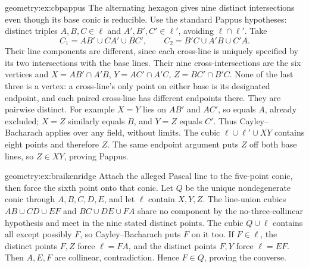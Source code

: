 \begin{solution}{geometry:ex:cbpappus}
\idea The alternating hexagon gives nine distinct intersections even though its base conic is reducible.
\writeup Use the standard Pappus hypotheses: distinct triples $A,B,C\in\ell$ and $A',B',C'\in\ell'$, avoiding $\ell\cap\ell'$. Take
\[
C_1=AB'\cup CA'\cup BC',\qquad
C_2=B'C\cup A'B\cup C'A.
\]
Their line components are different, since each cross-line is uniquely specified by its two intersections with the base lines. Their nine cross-intersections are the six vertices and $X=AB'\cap A'B$, $Y=AC'\cap A'C$, $Z=BC'\cap B'C$. None of the last three is a vertex: a cross-line's only point on either base is its designated endpoint, and each paired cross-line has different endpoints there. They are pairwise distinct. For example $X=Y$ lies on $AB'$ and $AC'$, so equals $A$, already excluded; $X=Z$ similarly equals $B$, and $Y=Z$ equals $C'$. Thus Cayley--Bacharach applies over any field, without limits. The cubic $\ell\cup\ell'\cup XY$ contains eight points and therefore $Z$. The same endpoint argument puts $Z$ off both base lines, so $Z\in XY$, proving Pappus.
\end{solution}
\begin{solution}{geometry:ex:braikenridge}
\idea Attach the alleged Pascal line to the five-point conic, then force the sixth point onto that conic.
\writeup Let $Q$ be the unique nondegenerate conic through $A,B,C,D,E$, and let $\ell$ contain $X,Y,Z$. The line-union cubics $AB\cup CD\cup EF$ and $BC\cup DE\cup FA$ share no component by the no-three-collinear hypothesis and meet in the nine stated distinct points. The cubic $Q\cup\ell$ contains all except possibly $F$, so Cayley--Bacharach puts $F$ on it too. If $F\in\ell$, the distinct points $F,Z$ force $\ell=FA$, and the distinct points $F,Y$ force $\ell=EF$. Then $A,E,F$ are collinear, contradiction. Hence $F\in Q$, proving the converse.
\end{solution}

